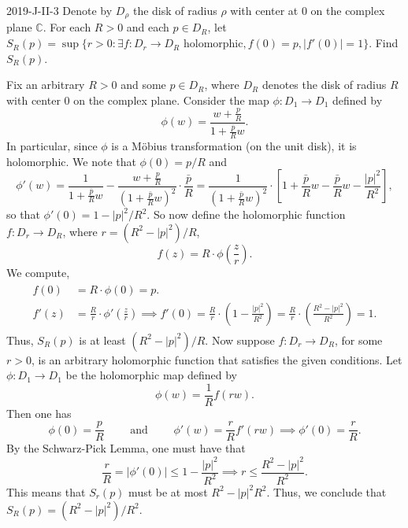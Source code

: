 \documentclass{article}
\begin{document}
	\begin{prb}{2019-J-II-3}
		Denote by $D_{\rho}$ the disk of radius $\rho$ with center at $0$ on the complex plane $\mathbb{C}$. For each $R > 0$ and each $p\in D_{R}$, let $S_{R}(p) = \sup\{r > 0 : \exists f: D_{r} \to D_{R} \text{ holomorphic}, f(0) = p, |f'(0)| = 1\}$. Find $S_{R}(p)$. 
	\end{prb}
	Fix an arbitrary $R > 0$ and some $p \in D_{R}$, where $D_{R}$ denotes the disk of radius $R$ with center $0$ on the complex plane. Consider the map $\phi: D_{1} \to D_{1}$ defined by 
	\begin{equation*}
		\phi(w) = \frac{w + \frac{p}{R}}{1 + \frac{\bar{p}}{R}w}. 
	\end{equation*}
	In particular, since $\phi$ is a M\"obius transformation (on the unit disk), it is holomorphic. We note that $\phi(0) = p/R$ and 
	\begin{equation*}
		\phi'(w) = \frac{1}{1 + \frac{\bar{p}}{R}w} - \frac{w + \frac{p}{R}}{(1 + \frac{\bar{p}}{R}w)^{2}} \cdot \frac{\bar{p}}{R} = \frac{1}{(1 + \frac{\bar{p}}{R}w)^{2}} \cdot \left[1 + \frac{\bar{p}}{R}w - \frac{\bar{p}}{R}w - \frac{|p|^{2}}{R^{2}}\right], 
	\end{equation*}
	so that $\phi'(0) = 1 - |p|^{2}/R^{2}$. So now define the holomorphic function $f: D_{r} \to D_{R}$, where $r = (R^{2} - |p|^{2})/R$,
	\begin{equation*}
		f(z) = R \cdot \phi\left(\frac{z}{r}\right). 
	\end{equation*}
	We compute, 
	\begin{align*}
		\begin{split}
			f(0) &= R \cdot \phi(0) = p. \\
			f'(z) &= \frac{R}{r}\cdot \phi'(\frac{z}{r}) \implies f'(0) = \frac{R}{r} \cdot \left(1 - \frac{|p|^{2}}{R^{2}}\right)  = \frac{R}{r} \cdot \left(\frac{R^{2} - |p|^{2}}{R^{2}}\right) = 1. 
		\end{split}
	\end{align*}
	Thus, $S_{R}(p)$ is at least $(R^{2} - |p|^{2})/R$. Now suppose $f: D_{r} \to D_{R}$, for some $r > 0$, is an arbitrary holomorphic function that satisfies the given conditions. Let $\phi: D_{1} \to D_{1}$ be the holomorphic map defined by 
	\begin{equation*}
		\phi(w) = \frac{1}{R}f(rw). 
	\end{equation*}
	Then one has 
	\begin{equation*}
		\phi(0) = \frac{p}{R} \qquad \text{ and } \qquad \phi'(w) = \frac{r}{R}f'(rw) \implies \phi'(0) = \frac{r}{R}. 
	\end{equation*}
	By the Schwarz-Pick Lemma, one must have that 
	\begin{equation*}
		\frac{r}{R} = |\phi'(0)| \leq 1 - \frac{|p|^{2}}{R^{2}} \implies r \leq \frac{R^{2} - |p|^{2}}{R^{2}}. 
	\end{equation*}
	This means that $S_{r}(p)$ must be at most $R^{2} - |p|^{2}{R^{2}}$. Thus, we conclude that $S_{R}(p) = (R^{2} - |p|^{2})/R^{2}$.
	
\end{document}
